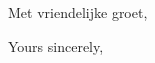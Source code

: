 \documentclass[dutch]{uuletter2}
\date{}
\begin{document}
\opening{Met vriendelijke groet,}

\lipsum

\closing[prof. dr. A.B.C. Zonnebloem]{Yours sincerely,}
\end{document}
